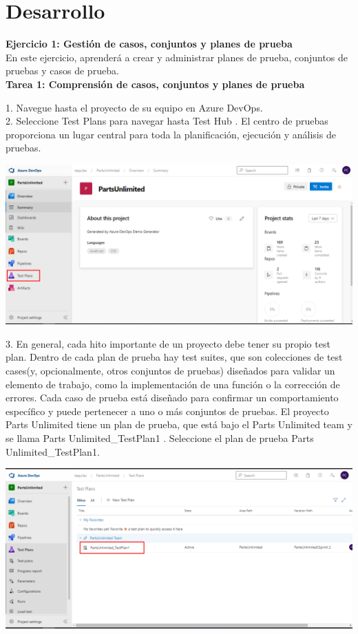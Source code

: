 \documentclass[12pt,letterpaper]{article}
\begin{document}
\section{Desarrollo}

\textbf{Ejercicio 1: Gestión de casos, conjuntos y planes de prueba}\\
En este ejercicio, aprenderá a crear y administrar planes de prueba, conjuntos de pruebas y casos de prueba.\\

\textbf{Tarea 1: Comprensión de casos, conjuntos y planes de prueba}

1. Navegue hasta el proyecto de su equipo en Azure DevOps.\\

2. Seleccione Test Plans para navegar hasta Test Hub . El centro de pruebas proporciona un lugar central para toda la planificación, ejecución y análisis de pruebas.

\begin{center}
		\includegraphics[width=15cm]{./Imagenes/1} 
\end{center}

3. En general, cada hito importante de un proyecto debe tener su propio  test plan. Dentro de cada plan de prueba hay test suites, que son colecciones de test cases(y, opcionalmente, otros conjuntos de pruebas) diseñados para validar un elemento de trabajo, como la implementación de una función o la corrección de errores. Cada caso de prueba está diseñado para confirmar un comportamiento específico y puede pertenecer a uno o más conjuntos de pruebas. El proyecto Parts Unlimited tiene un plan de prueba, que está bajo el Parts Unlimited team y se llama Parts Unlimited\_TestPlan1 . Seleccione el plan de prueba Parts Unlimited\_TestPlan1.

\begin{center}
		\includegraphics[width=15cm]{./Imagenes/2} 
\end{center}
\end{document}
